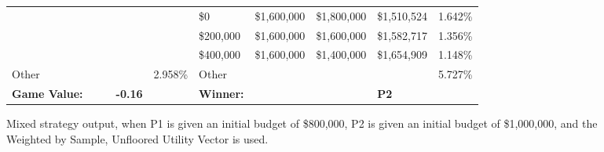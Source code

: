 \documentclass[11pt]{article}
\begin{document}
\begin{figure}
\begin{tabular}{ |p{1.0cm}p{1.0cm}p{1.0cm}p{2.0cm}|p{1.0cm}||p{1.0cm}p{1.0cm}p{1.0cm}p{2.0cm}|p{1.0cm}|}
&&&& & \$0 & \$1,600,000 & \$1,800,000 & \$1,510,524 & 1.642\% \\
&&&& & \$200,000 & \$1,600,000 & \$1,600,000 & \$1,582,717 & 1.356\% \\
&&&& & \$400,000 & \$1,600,000 & \$1,400,000 & \$1,654,909 & 1.148\% \\
\hline
Other &&&& 2.958\% & Other &&&& 5.727\% \\
\hline
\small \textbf{Game Value:} &&& \small \textbf{-0.16} && \small \textbf{Winner:} &&& \small \textbf{P2}&\\
\hline
\end{tabular}
\caption{Mixed strategy output, when P1 is given an initial budget of \$800,000, P2 is given an initial budget of \$1,000,000, and the Weighted by Sample, Unfloored Utility Vector is used.}
\label{8v10table.6}
\end{figure}
\end{document}
